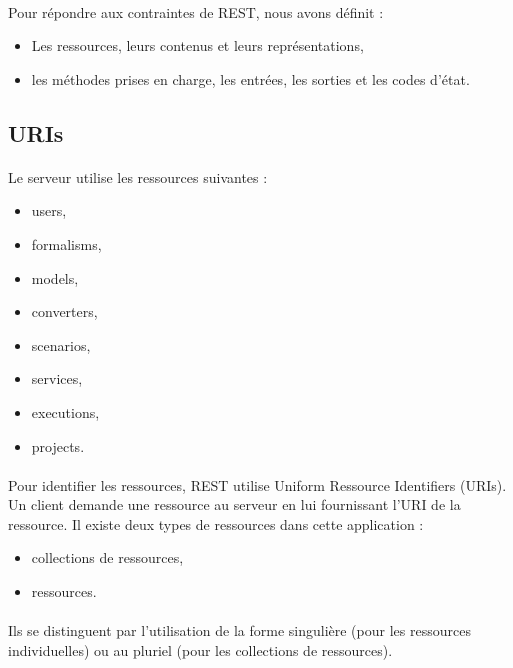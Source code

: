 \documentclass{report}
\begin{document}
\paragraph{}
Pour répondre aux contraintes de REST, nous avons définit : 
\begin{itemize}
\item Les ressources, leurs contenus et leurs représentations,
\item les méthodes prises en charge, les entrées, les sorties et les codes d'état.
\end{itemize}

\subsection{URIs}
\paragraph{}
Le serveur utilise les ressources suivantes : 

\begin{itemize}
    \item users,
    \item formalisms,
    \item models,
    \item converters,
    \item scenarios,
    \item services,
    \item executions,
    \item projects.
\end{itemize}

\paragraph{}
Pour identifier les ressources, REST utilise Uniform Ressource Identifiers (URIs). Un client demande une ressource au 
serveur en lui fournissant l'URI de la ressource. Il existe deux types de ressources dans cette application : \\

\begin{itemize}
    \item collections de ressources,
    \item ressources.
\end{itemize}

\paragraph{}
Ils se distinguent par l'utilisation de la forme singulière (pour les ressources individuelles) ou au pluriel (pour les
collections de ressources).
\end{document}
